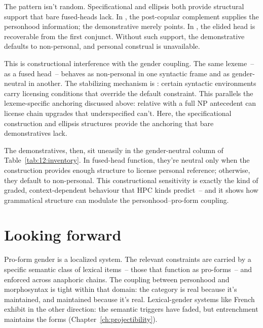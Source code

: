 The pattern isn't random. Specificational  and ellipsis both provide structural support that bare fused-heads lack. In , the post-copular complement supplies the personhood information; the demonstrative merely points. In , the elided head  is recoverable from the first conjunct. Without such support, the demonstrative defaults to non-personal, and personal construal is unavailable.

This is constructional interference with the gender coupling. The same lexeme~--  as a fused head~-- behaves as non-personal in one syntactic frame and as gender-neutral in another. The stabilizing mechanism is : certain syntactic environments carry licensing conditions that override the default constraint. This parallels the lexeme-specific anchoring discussed above: relative  with a full NP antecedent can license chain upgrades that underspecified  can't. Here, the specificational  construction and ellipsis structures provide the anchoring that bare demonstratives lack.

The demonstratives, then, sit uneasily in the gender-neutral column of Table~\ref{tab:12:inventory}. In fused-head function, they're neutral only when the construction provides enough structure to license personal reference; otherwise, they default to non-personal. This constructional sensitivity is exactly the kind of graded, context-dependent behaviour that HPC kinds predict~-- and it shows how grammatical structure can modulate the personhood--pro-form coupling.


\section{Looking forward}
\label{sec:12:transition}

Pro-form gender is a localized system. The relevant constraints are carried by a specific semantic class of lexical items~-- those that function as pro-forms~-- and enforced across anaphoric chains. The coupling between personhood and morphosyntax is tight within that domain: the category is real because it's maintained, and maintained because it's real. Lexical-gender systems like French exhibit  in the other direction: the semantic triggers have faded, but entrenchment maintains the forms (Chapter~\ref{ch:projectibility}).

